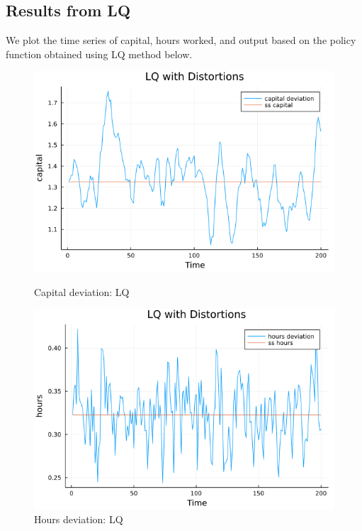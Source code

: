 \documentclass[12pt]{article}
\begin{document}
\subsection{Results from LQ}
We plot the time series of capital, hours worked, and output based on the policy function obtained using LQ method below.
\begin{figure}[h]
    \centering
    \begin{minipage}{0.45\textwidth}
        \centering
        \includegraphics[width=1\textwidth]{k_dev_LQ_new.png} %
        \caption{Capital deviation: LQ}\label{LQ_sim}
    \end{minipage}\hfill
    \begin{minipage}{0.45\textwidth}
        \centering
        \includegraphics[width=1\textwidth]{h_dev_LQ_new.png} %
        \caption{Hours deviation: LQ}\label{LQ_sim}
    \end{minipage}

\end{figure}
\end{document}
